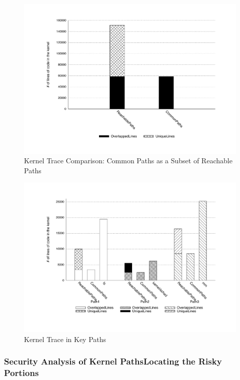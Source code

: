 \begin{figure}
\centering
\includegraphics[width=1.0\columnwidth]{diagram/lind_oakland16_diagram_01.pdf}
\caption{Kernel Trace Comparison: Common Paths as a Subset of Reachable
Paths}
\label{fig:subset}
\end{figure}

\begin{figure}
\centering
\includegraphics[width=1.0\columnwidth]{diagram/lind_oakland16_diagram_02.pdf}
\caption{Kernel Trace in Key Paths}
\label{fig:key_paths_trace}
\end{figure}

\subsubsection{Security Analysis of Kernel Paths\textendash Locating the
Risky Portions}

